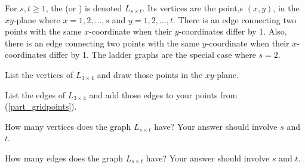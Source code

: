 \begin{exer}[\exerE] %
\label{exer_grid_graphs}
    For $s,t \ge 1$, the  (or ) is denoted $L_{s\times t}$.  Its vertices are the point,s $(x,y)$, in the $xy$-plane where $x = 1, 2, \ldots, s$ and $y = 1, 2, \ldots, t$.  There is an edge connecting two points with the same $x$-coordinate when their $y$-coordinates differ by 1. Also, there is an edge connecting two points with the same $y$-coordinate when their $x$-coordinates differ by 1.  The ladder graphs are the special case where $s=2$.
    \begin{exerpart}
        \item \label{part_gridpoints} List the vertices of $L_{3 \times 4}$ and draw those points in the $xy$-plane.
        \item List the edges of $L_{3 \times 4}$ and add those edges to your points from (\ref{part_gridpoints}).
        \item How many vertices does the graph $L_{s \times t}$ have? Your answer should involve $s$ and $t$.
        \item How many edges does the graph $L_{s \times t}$ have? Your answer should involve $s$ and $t$.
    \end{exerpart}
\end{exer}

